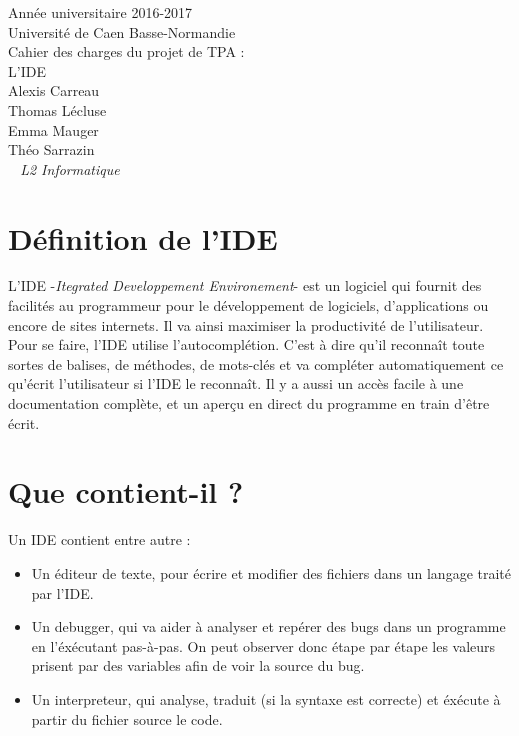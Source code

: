 \documentclass[a4paper,12pt]{article} %
\begin{document}

\begin{titlepage}
	\begin{center}
		\Large{Année universitaire 2016-2017}\\
		\Large{Université de Caen Basse-Normandie}\\[1cm]
		
		\huge{Cahier des charges du projet de TPA :}\\
		L'IDE\\
		\vspace{3cm}
		Alexis Carreau\\
		Thomas Lécluse\\
		Emma Mauger\\
		Théo Sarrazin\\
	\normalsize{\textit{ ~ L2 Informatique}}\\
		\medskip
		\vspace{2cm}
		
	\end{center}
\end{titlepage}

\tableofcontents
\newpage

\section{Définition de l'IDE}
	L'IDE -\normalsize{\textit{Itegrated Developpement Environement}}- est un logiciel qui fournit des facilités au programmeur pour le développement de logiciels, d'applications ou encore de sites internets. Il va ainsi maximiser la productivité de l'utilisateur.\\ 	
	Pour se faire, l'IDE utilise l'autocomplétion. C'est à dire qu'il reconnaît toute sortes de balises, de méthodes, de mots-clés et va compléter automatiquement ce qu'écrit l'utilisateur si l'IDE le reconnaît. Il y a aussi un accès facile à une documentation complète, et un aperçu en direct du programme en train d'être écrit.
	
\section{Que contient-il ?}
	Un IDE contient entre autre :
	\begin{itemize}
		\item Un éditeur de texte, pour écrire et modifier des fichiers dans un langage traité par l'IDE.
		\item Un debugger, qui va aider à analyser et repérer des bugs dans un programme en l'éxécutant pas-à-pas. On peut observer donc étape par étape les valeurs prisent par des variables afin de voir la source du bug.
		\item Un interpreteur, qui analyse, traduit (si la syntaxe est correcte) et éxécute à partir du fichier source le code.
	\end{itemize}
	
\end{document}
